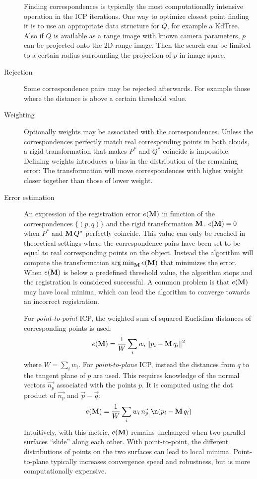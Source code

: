 \begin{description}
Finding correspondences is typically the most computationally intensive operation in the ICP iterations. One way to optimize closest point finding it is to use an appropriate data structure for $Q$, for example a KdTree. Also if $Q$ is available as a range image with known camera parameters, $p$ can be projected onto the 2D range image. Then the search can be limited to a certain radius surrounding the projection of $p$ in image space.
\item[Rejection] Some correspondence pairs may be rejected afterwards. For example those where the distance is above a certain threshold value.
\item[Weighting] Optionally weights may be associated with the correspondences. Unless the correspondences perfectly match real corresponding points in both clouds, a rigid transformation that makes $P^*$ and $Q^*$ coincide is impossible. Defining weights introduces a bias in the distribution of the remaining error: The transformation will move correspondences with higher weight closer together than those of lower weight.
\item[Error estimation] An expression of the registration error $e(\mathbf{M})$ in function of the correspondences $\{ (p, q) \}$ and the rigid transformation $\mathbf{M}$. $e(\mathbf{M}) = 0$ when $P^*$ and $\mathbf{M} \, Q^*$ perfectly coincide. This value can only be reached in theoretical settings where the correspondence pairs have been set to be equal to real corresponding points on the object. Instead the algorithm will compute the transformation $\operatorname*{arg\,min}_{\mathbf{M}} e(\mathbf{M})$ that minimizes the error. When $e(\mathbf{M})$ is below a predefined threshold value, the algorithm stops and the registration is considered successful. A common problem is that $e(\mathbf{M})$ may have local minima, which can lead the algorithm to converge towards an incorrect registration. 

For \emph{point-to-point} ICP, the weighted sum of squared Euclidian distances of corresponding points is used:
$$
e(\mathbf{M}) = \frac{1}{W} \sum_{i} w_i \, \| p_i - \mathbf{M} \, q_i \|^2
$$
where $W = \sum_i w_i$. For \emph{point-to-plane} ICP, instead the distances from $q$ to the tangent plane of $p$ are used. This requires knowledge of the normal vectors $\vec{n_p}$ associated with the points $p$. It is computed using the dot product of $\vec{n_p}$ and $\vec{p} - \vec{q}$:
$$
e(\matr{M}) = \frac{1}{W} \sum_{i} w_i \, \vec{n_{p_i}} \n (p_i - \matr{M} \, q_i)
$$
Intuitively, with this metric, $e(\mathbf{M})$ remains unchanged when two parallel surfaces ``slide'' along each other. With point-to-point, the different distributions of points on the two surfaces can lead to local minima. Point-to-plane typically increases convergence speed and robustness, but is more computationally expensive.


\end{description}
